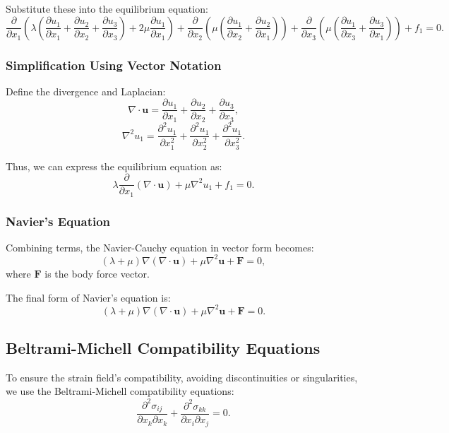 \documentclass[fleqn,10pt]{olplainarticle}
\begin{document}
Substitute these into the equilibrium equation:
\[
\frac{\partial}{\partial x_1} \left( \lambda \left( \frac{\partial u_1}{\partial x_1} + \frac{\partial u_2}{\partial x_2} + \frac{\partial u_3}{\partial x_3} \right) + 2 \mu \frac{\partial u_1}{\partial x_1} \right) + \frac{\partial}{\partial x_2} \left( \mu \left( \frac{\partial u_1}{\partial x_2} + \frac{\partial u_2}{\partial x_1} \right) \right) + \frac{\partial}{\partial x_3} \left( \mu \left( \frac{\partial u_1}{\partial x_3} + \frac{\partial u_3}{\partial x_1} \right) \right) + f_1 = 0.
\]

\subsubsection{Simplification Using Vector Notation}

Define the divergence and Laplacian:
\[
\nabla \cdot \mathbf{u} = \frac{\partial u_1}{\partial x_1} + \frac{\partial u_2}{\partial x_2} + \frac{\partial u_3}{\partial x_3},
\]
\[
\nabla^2 u_1 = \frac{\partial^2 u_1}{\partial x_1^2} + \frac{\partial^2 u_1}{\partial x_2^2} + \frac{\partial^2 u_1}{\partial x_3^2}.
\]

Thus, we can express the equilibrium equation as:
\[
\lambda \frac{\partial}{\partial x_1} (\nabla \cdot \mathbf{u}) + \mu \nabla^2 u_1 + f_1 = 0.
\]

\subsubsection{Navier's Equation}

Combining terms, the Navier-Cauchy equation in vector form becomes:
\[
(\lambda + \mu) \nabla (\nabla \cdot \mathbf{u}) + \mu \nabla^2 \mathbf{u} + \mathbf{F} = 0,
\]
where \(\mathbf{F}\) is the body force vector.

The final form of Navier’s equation is:
\[
\boxed{(\lambda + \mu) \nabla (\nabla \cdot \mathbf{u}) + \mu \nabla^2 \mathbf{u} + \mathbf{F} = 0.}
\]



\subsection{Beltrami-Michell Compatibility Equations}
To ensure the strain field's compatibility, avoiding discontinuities or singularities, we use the Beltrami-Michell compatibility equations:
\begin{equation}
\frac{\partial^2 \sigma_{ij}}{\partial x_k \partial x_k} + \frac{\partial^2 \sigma_{kk}}{\partial x_i \partial x_j} = 0.
\end{equation}
\end{document}
